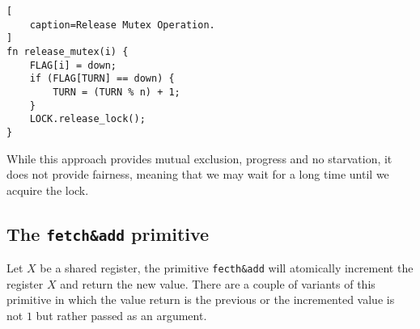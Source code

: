 \begin{lstlisting}[
    caption=Release Mutex Operation.
]
fn release_mutex(i) {
    FLAG[i] = down;
    if (FLAG[TURN] == down) {
        TURN = (TURN % n) + 1;
    }
    LOCK.release_lock();
}
\end{lstlisting}

While this approach provides mutual exclusion, progress and no starvation,
it does not provide fairness, meaning that we may wait for a long time until we acquire the lock.

\subsection{The \texttt{fetch\&add} primitive}

Let $X$ be a shared register, the primitive \texttt{fecth\&add} will atomically increment the register $X$ and return the new value.
There are a couple of variants of this primitive in which the value return is the previous or the incremented value is not $1$ but rather passed as an argument.
